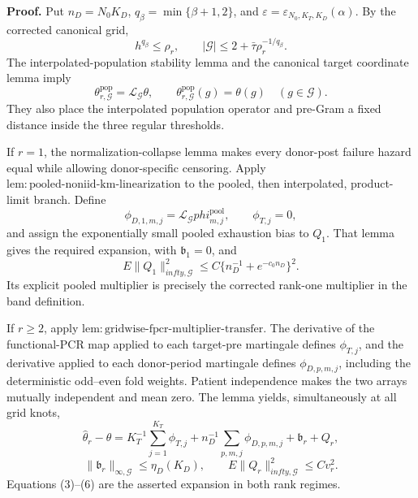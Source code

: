 \textbf{Proof.}
Put \(n_D=N_0K_D\), \(q_\beta=\min\{\beta+1,2\}\), and
\(\varepsilon=\varepsilon_{N_0,K_T,K_D}(\alpha)\).  By the corrected
canonical grid,
\[
 h^{q_\beta}\le\rho_r,
 \qquad |\mathcal G|\le2+\bar\tau\rho_r^{-1/q_\beta}.       \tag{1}
\]
The interpolated-population stability lemma and the canonical target
coordinate lemma imply
\[
 \theta^{\mathrm{pop}}_{r,\mathcal G}
 =\mathcal L_{\mathcal G}\theta,
 \qquad
 \theta^{\mathrm{pop}}_{r,\mathcal G}(g)=\theta(g)
 \quad(g\in\mathcal G).                                    \tag{2}
\]
They also place the interpolated population operator and pre-Gram a fixed
distance inside the three regular thresholds.

If \(r=1\), the normalization-collapse lemma makes every donor-post failure
hazard equal while allowing donor-specific censoring.  Apply
\(\mathrm{lem:pooled\mbox{-}noniid\mbox{-}km\mbox{-}linearization}\) to the
pooled, then interpolated, product-limit branch.  Define
\[
 \phi_{D,1,m,j}=\mathcal L_{\mathcal G}phi_{m,j}^{\mathrm{pool}},
 \qquad \phi_{T,j}=0,                                      \tag{3}
\]
and assign the exponentially small pooled exhaustion bias to \(Q_1\).
That lemma gives the required expansion, with \(\mathfrak b_1=0\), and
\[
 E\|Q_1\|_{infty,\mathcal G}^2
 \le C\{n_D^{-1}+e^{-c_0n_D}\}^2.                         \tag{4}
\]
Its explicit pooled multiplier is precisely the corrected rank-one
multiplier in the band definition.

If \(r\ge2\), apply
\(\mathrm{lem:gridwise\mbox{-}fpcr\mbox{-}multiplier\mbox{-}transfer}\).
The derivative of the functional-PCR map applied to each target-pre
martingale defines \(\phi_{T,j}\), and the derivative applied to each
donor-period martingale defines \(\phi_{D,p,m,j}\), including the
deterministic odd--even fold weights.  Patient independence makes the two
arrays mutually independent and mean zero.  The lemma yields, simultaneously
at all grid knots,
\[
 \widehat\theta_r-\theta
 =K_T^{-1}\sum_{j=1}^{K_T}\phi_{T,j}
  +n_D^{-1}\sum_{p,m,j}\phi_{D,p,m,j}
  +\mathfrak b_r+Q_r,                                      \tag{5}
\]
\[
 \|\mathfrak b_r\|_{\infty,\mathcal G}\le\eta_D(K_D),
 \qquad E\|Q_r\|_{infty,\mathcal G}^2\le Cv_r^2.         \tag{6}
\]
Equations (3)--(6) are the asserted expansion in both rank regimes.

